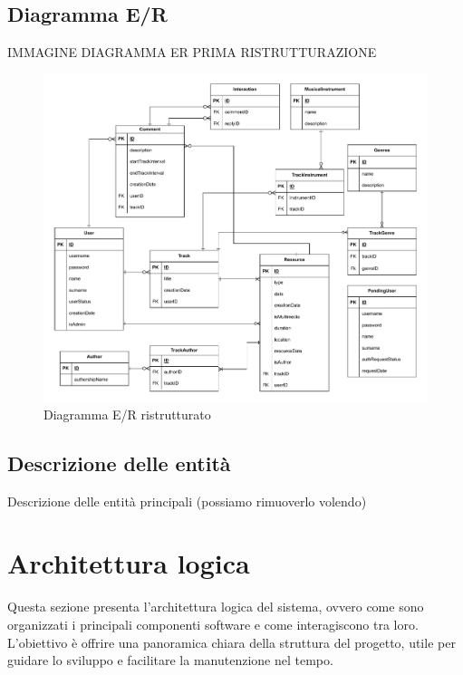 \documentclass[a4paper]{article}
\begin{document}
\subsection{Diagramma E/R}
IMMAGINE DIAGRAMMA ER PRIMA RISTRUTTURAZIONE
\begin{figure}[H]
    \centering
    \includegraphics[width=1.1 \textwidth]{./figures/diagramma_er_ristrutturato}
    \caption{Diagramma E/R ristrutturato}
    \label{fig:er_ristrutturato}
\end{figure}

\subsection{Descrizione delle entità}
Descrizione delle entità principali (possiamo rimuoverlo volendo)

\section{Architettura logica}
Questa sezione presenta l’architettura logica del sistema, ovvero come sono organizzati i principali componenti software e come interagiscono tra loro. L’obiettivo è offrire una panoramica chiara della struttura del progetto, utile per guidare lo sviluppo e facilitare la manutenzione nel tempo.
\end{document}
